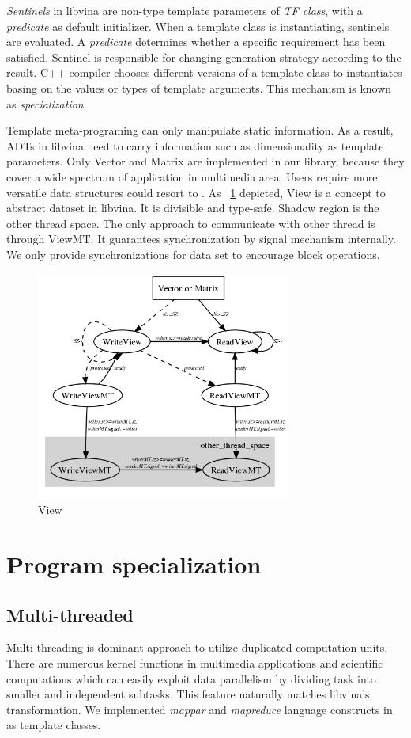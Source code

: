\documentclass[10pt, conference, compsocconf]{IEEEtran}
\begin{document}
\emph{Sentinels} in libvina are non-type template parameters of \emph{TF class}, with a \emph{predicate} as default initializer. When a template class is instantiating, sentinels are evaluated.  A \emph{predicate} determines whether a specific requirement has been satisfied. Sentinel is responsible for changing generation strategy according to the result. C++ compiler chooses different versions of a template class to instantiates basing on the values or types of template arguments. This mechanism is known as \emph{specialization}.

Template meta-programing can only manipulate static information. As a result, ADTs in libvina need to carry information such as dimensionality as template parameters. Only Vector and Matrix are implemented in our library, because they cover a wide spectrum of application in multimedia area. Users require more versatile data structures could resort to \cite{10}. As ~\ref{fig:view} depicted, View is a concept to abstract dataset in libvina. It is divisible and type-safe. Shadow region is the other thread space. The only approach to communicate with other thread is through ViewMT. It guarantees synchronization by signal mechanism internally. We only provide synchronizations for data set to encourage block operations.  

\begin{figure}
\includegraphics[width=3.3in]{view_concept}
\caption{View}
\label{fig:view}
\end{figure}

%
\section{Program specialization}
\subsection{Multi-threaded}
Multi-threading is dominant approach to utilize duplicated computation units.  There are numerous kernel functions in multimedia applications and scientific computations which can easily exploit data parallelism by dividing task into smaller and independent subtasks. This feature naturally matches libvina's transformation. We implemented \emph{mappar} and \emph{mapreduce} language constructs in \cite{1} as template classes. 
\end{document}
